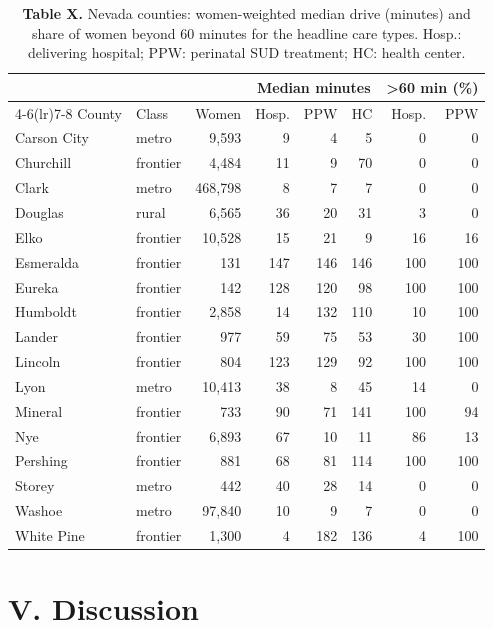 \documentclass{article}
\begin{document}
\begin{table}
\centering\caption{\textbf{Table X.} Nevada counties: women-weighted median drive (minutes) and share of women beyond 60 minutes for the headline care types. Hosp.: delivering hospital; PPW: perinatal SUD treatment; HC: health center.}
\begin{tabular}{@{}llrrrrrr@{}}
\toprule
 & & & \multicolumn{3}{c}{Median minutes} & \multicolumn{2}{c}{>60 min (\%)} \\
\cmidrule(lr){4-6}\cmidrule(lr){7-8}
County & Class & Women & Hosp. & PPW & HC & Hosp. & PPW \\
\midrule
Carson City & metro & 9,593 & 9 & 4 & 5 & 0 & 0 \\
Churchill & frontier & 4,484 & 11 & 9 & 70 & 0 & 0 \\
Clark & metro & 468,798 & 8 & 7 & 7 & 0 & 0 \\
Douglas & rural & 6,565 & 36 & 20 & 31 & 3 & 0 \\
Elko & frontier & 10,528 & 15 & 21 & 9 & 16 & 16 \\
Esmeralda & frontier & 131 & 147 & 146 & 146 & 100 & 100 \\
Eureka & frontier & 142 & 128 & 120 & 98 & 100 & 100 \\
Humboldt & frontier & 2,858 & 14 & 132 & 110 & 10 & 100 \\
Lander & frontier & 977 & 59 & 75 & 53 & 30 & 100 \\
Lincoln & frontier & 804 & 123 & 129 & 92 & 100 & 100 \\
Lyon & metro & 10,413 & 38 & 8 & 45 & 14 & 0 \\
Mineral & frontier & 733 & 90 & 71 & 141 & 100 & 94 \\
Nye & frontier & 6,893 & 67 & 10 & 11 & 86 & 13 \\
Pershing & frontier & 881 & 68 & 81 & 114 & 100 & 100 \\
Storey & metro & 442 & 40 & 28 & 14 & 0 & 0 \\
Washoe & metro & 97,840 & 10 & 9 & 7 & 0 & 0 \\
White Pine & frontier & 1,300 & 4 & 182 & 136 & 4 & 100 \\
\bottomrule
\end{tabular}

\end{table}

\section*{V. Discussion}
\end{document}
